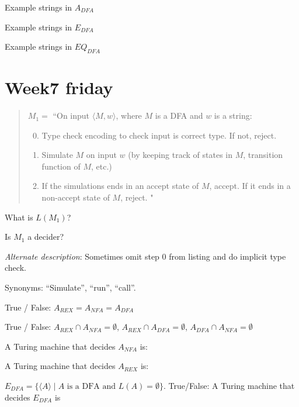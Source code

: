 \documentclass[12pt, oneside]{article}
\begin{document}
    Example strings in $A_{DFA}$
    
    \vfill
    
    Example strings in  $E_{DFA}$
    
    \vfill
    
    Example strings in  $EQ_{DFA}$
    
    \vfill
 \vfill
\section*{Week7 friday}


  \begin{quote}
  $M_1 = $ ``On input $\langle M,w\rangle$, where $M$ is a DFA and $w$ is a string:
  \begin{enumerate}
  \setcounter{enumi}{-1}
  \item Type check encoding to check input is correct type. If not, reject.
  \item Simulate $M$ on input $w$ (by keeping track of states in $M$, transition function of $M$, etc.) 
  \item If the simulations ends in an accept state of $M$, accept. If it ends in a non-accept state of $M$, reject. "
  \end{enumerate}
  \end{quote}
  

What is $L(M_1)$? 

\vfill

Is $M_1$ a decider?

\vfill


{\it Alternate description}:
Sometimes omit step 0 from listing and do implicit type check.

Synonyms: ``Simulate'', ``run'', ``call''.

\newpage

  True / False: $A_{REX} = A_{NFA} = A_{DFA}$

  True / False: $A_{REX} \cap A_{NFA} = \emptyset$, $A_{REX} \cap A_{DFA} = \emptyset$, $A_{DFA} \cap A_{NFA} = \emptyset$

  
  A Turing machine that  decides $A_{NFA}$ is: 
  
  \vfill
  
  A Turing machine that  decides $A_{REX}$ is: 
  
  \vfill

  $E_{DFA} = \{ \langle A \rangle \mid  \text{$A$ is a  DFA and  $L(A) = \emptyset$}\}$. 
  True/False: A Turing machine that  decides $E_{DFA}$ is
\end{document}
